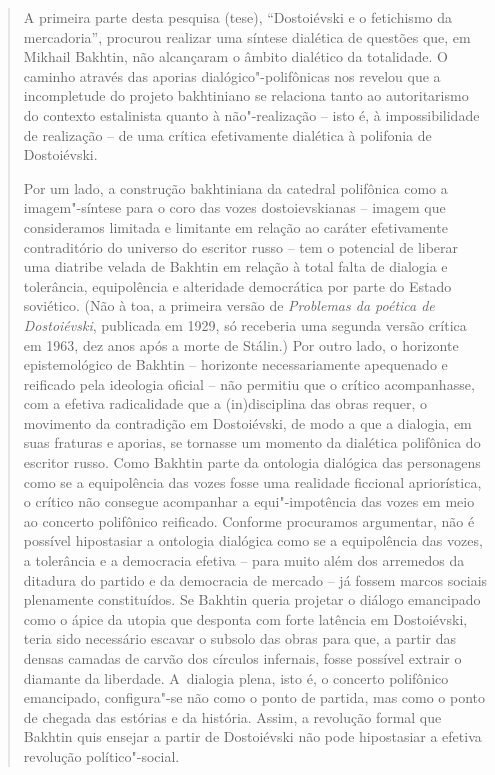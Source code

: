 {\begin{quote}
A primeira parte desta pesquisa (tese), ``Dostoiévski e o fetichismo da
mercadoria'', procurou realizar uma síntese dialética de questões que,
em Mikhail Bakhtin, não alcançaram o âmbito dialético da totalidade. O
caminho através das aporias dialógico"-polifônicas nos revelou que a
incompletude do projeto bakhtiniano se relaciona tanto ao autoritarismo
do contexto estalinista quanto à não"-realização -- isto é, à
impossibilidade de realização -- de uma crítica efetivamente dialética à
polifonia de Dostoiévski.

Por um lado, a construção bakhtiniana da catedral polifônica como a
imagem"-síntese para o coro das vozes dostoievskianas -- imagem que
consideramos limitada e limitante em relação ao caráter efetivamente
contraditório do universo do escritor russo -- tem o potencial de
liberar uma diatribe velada de Bakhtin em relação à total falta de
dialogia e tolerância, equipolência e alteridade democrática por parte
do Estado soviético. (Não à toa, a primeira versão de \emph{Problemas da
poética de Dostoiévski}, publicada em 1929, só receberia uma segunda
versão crítica em 1963, dez anos após a morte de Stálin.) Por outro
lado, o horizonte epistemológico de Bakhtin -- horizonte necessariamente
apequenado e reificado pela ideologia oficial -- não permitiu que o
crítico acompanhasse, com a efetiva radicalidade que a (in)disciplina
das obras requer, o movimento da contradição em Dostoiévski, de modo a
que a dialogia, em suas fraturas e aporias, se tornasse um momento da
dialética polifônica do escritor russo. Como Bakhtin parte da ontologia
dialógica das personagens como se a equipolência das vozes fosse uma
realidade ficcional apriorística, o crítico não consegue acompanhar a
equi"-impotência das vozes em meio ao concerto polifônico reificado.
Conforme procuramos argumentar, não é possível hipostasiar a ontologia
dialógica como se a equipolência das vozes, a tolerância e a democracia
efetiva -- para muito além dos arremedos da ditadura do partido e da
democracia de mercado -- já fossem marcos sociais plenamente
constituídos. Se Bakhtin queria projetar o diálogo emancipado como o
ápice da utopia que desponta com forte latência em Dostoiévski, teria
sido necessário escavar o subsolo das obras para que, a partir das
densas camadas de carvão dos círculos infernais, fosse possível extrair
o diamante da liberdade. A~dialogia plena, isto é, o concerto polifônico
emancipado, configura"-se não como o ponto de partida, mas como o ponto
de chegada das estórias e da história. Assim, a revolução formal que
Bakhtin quis ensejar a partir de Dostoiévski não pode hipostasiar a
efetiva revolução político"-social.


\end{quote}}
